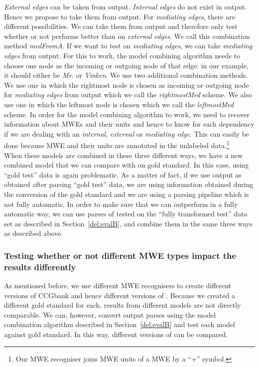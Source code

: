\documentclass[output=paper]{langsci/langscibook}
\begin{document}
    \indent \textit{External edges} can be taken from output. \textit{Internal edges} do not exist in out\-put. Hence we propose to take them from output. For \textit{mediating edges}, there are different possibilities. We can take them from output and therefore only test whether or not {\modelB} performs better than {\modelA} on \textit{external edges}. We call this combination method \textit{medFromA}. If we want to test {\modelB} on \textit{mediating edges}, we can take \textit{mediating edges} from output. For this to work, the model combining algorithm needs to choose one node as the incoming or outgoing node of that edge: in our example, it should either be \textit{Mr.} or \textit{Vinken}. We use two additional combination methods. We use one in which the rightmost node is chosen as incoming or outgoing node for \textit{mediating edges} from output which we call the \textit{rightmostMed} scheme. We also use one in which the leftmost node is chosen which we call the \textit{leftmostMed} scheme. In order for the model combining algorithm to work, we need to recover information about MWEs and their units and hence to know for each dependency if we are dealing with an \textit{internal}, \textit{external} or \textit{mediating edge}. This can easily be done because MWE and their units are annotated in the unlabeled data.\footnote{Our MWE recogniser joins MWE units of a MWE by a ``+'' symbol.}\\
    \indent When these models are combined in these three different ways, we have a new combined model that we can compare with {\modelA} on gold standard. In this case, using ``gold test'' data is again problematic. As a matter of fact, if we use output as obtained after parsing ``gold test'' data, we are using information obtained during the conversion of the gold standard and we are using a parsing pipeline which is not fully automatic. In order to make sure that we can outperform {\modelA} in a fully automatic way, we can use parses of {\modelB} tested on the ``fully transformed test'' data set as described in Section~\ref{del:evalB}, and combine them in the same three ways as described above.

    \subsubsection{Testing whether or not different MWE types impact the results differently}
    \label{del:evalB2}
    \indent As mentioned before, we use different MWE recognisers to create different versions of CCGbank and hence different versions of {\modelB}. Because we created a different gold standard for each, results from different models are not directly comparable. We can, however, convert output parses using the model combination algorithm described in Section~\ref{del:evalB} and test each model against gold standard. In this way, different versions of {\modelB} can be compared.
\end{document}
